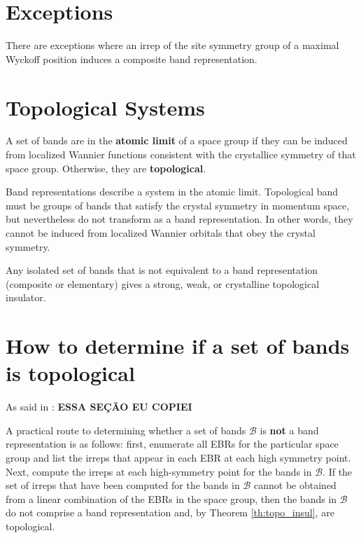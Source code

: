 \section{Exceptions}

There are exceptions where an irrep of the site symmetry group of a maximal Wyckoff position induces a composite band representation.

\section{Topological Systems}

\begin{definition}
A set of bands are in the \textbf{atomic limit} of a space group if they can be induced from localized Wannier functions consistent with the crystallice symmetry of that space group. Otherwise, they are \textbf{topological}.
\end{definition}

Band representations describe a system in the atomic limit. Topological band must be groups of bands that satisfy the crystal symmetry in momentum space, but nevertheless do not transform as a band representation. In other words, they cannot be induced from localized Wannier orbitals that obey the crystal symmetry.

\begin{theorem} \label{th:topo_insul}
Any isolated set of bands that is not equivalent to a band representation (composite or elementary) gives a strong, weak, or crystalline topological insulator.
\end{theorem}


\section{How to determine if a set of bands is topological}

As said in \cite{building_blocks2018}: \textbf{ESSA SEÇÃO EU COPIEI}

A practical route to determining whether a set of bands $\mathcal{B}$ is \textbf{not} a band representation is as follows: first, enumerate all EBRs for the particular space group and list the irreps that appear in each EBR at each high symmetry point. Next, compute the irreps at each high-symmetry point for the bands in $\mathcal{B}$. If the set of irreps that have been computed for the bands in $\mathcal{B}$ cannot be obtained from a linear combination of the EBRs in the space group, then the bands in $\mathcal{B}$ do not comprise a band representation and, by Theorem \ref{th:topo_insul}, are topological.

